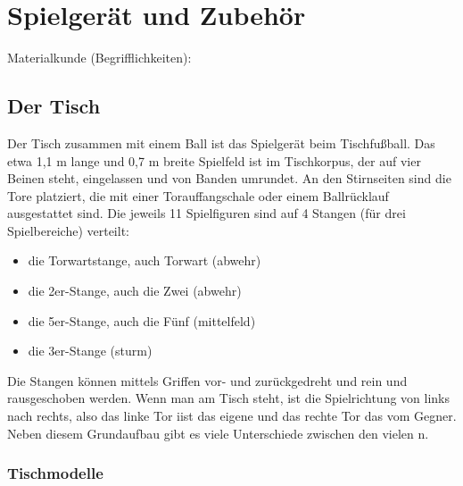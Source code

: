 \chapter{Spielgerät und Zubehör}
\label{tisch}

Materialkunde (Begrifflichkeiten):



\section{Der Tisch}
\label{tisch:tisch}

Der Tisch zusammen mit einem Ball ist das Spielgerät beim Tischfußball. 
Das etwa 1,1 m lange und 0,7 m breite Spielfeld ist im Tischkorpus, der auf vier Beinen steht, eingelassen und von Banden umrundet. An den Stirnseiten sind die Tore platziert, die mit einer Torauffangschale oder einem Ballrücklauf ausgestattet sind.  
Die jeweils 11 Spielfiguren sind auf 4 Stangen (für drei Spielbereiche) verteilt:
\begin{itemize}  
\item die Torwartstange, auch Torwart (\gls{abwehr}) 
\item die 2er-Stange, auch die Zwei (\gls{abwehr}) 
\item die 5er-Stange, auch die Fünf (\gls{mittelfeld})
\item die 3er-Stange (\gls{sturm})
\end{itemize}  
Die Stangen können mittels Griffen vor- und zurückgedreht und rein und rausgeschoben werden.
Wenn man am Tisch steht, ist die Spielrichtung von links nach rechts, also das linke Tor iist das eigene und das rechte Tor das vom Gegner.
Neben diesem Grundaufbau gibt es viele Unterschiede zwischen den vielen n. 

\subsection{Tischmodelle}
\label{tisch:tisch:modelle}

